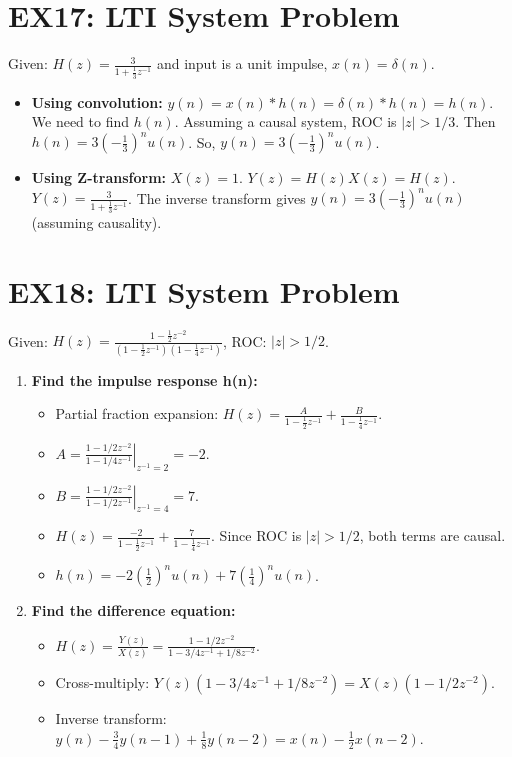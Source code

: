 \documentclass[a4paper,12pt]{article}
\begin{document}
\section*{EX17: LTI System Problem}
Given: $H(z) = \frac{3}{1+\frac{1}{3}z^{-1}}$ and input is a unit impulse, $x(n)=\delta(n)$.
\begin{itemize}
    \item \textbf{Using convolution:} $y(n) = x(n)*h(n) = \delta(n)*h(n)=h(n)$. We need to find $h(n)$. Assuming a causal system, ROC is $|z|>1/3$. Then $h(n) = 3(-\frac{1}{3})^n u(n)$. So, $y(n)=3(-\frac{1}{3})^n u(n)$.
    \item \textbf{Using Z-transform:} $X(z)=1$. $Y(z)=H(z)X(z)=H(z)$.
    $Y(z) = \frac{3}{1+\frac{1}{3}z^{-1}}$. The inverse transform gives $y(n)=3(-\frac{1}{3})^n u(n)$ (assuming causality).
\end{itemize}


\section*{EX18: LTI System Problem}
Given: $H(z) = \frac{1-\frac{1}{2}z^{-2}}{(1-\frac{1}{2}z^{-1})(1-\frac{1}{4}z^{-1})}$, ROC: $|z|>1/2$.
\begin{enumerate}
    \item \textbf{Find the impulse response h(n):}
        \begin{itemize}
            \item Partial fraction expansion: $H(z) = \frac{A}{1-\frac{1}{2}z^{-1}} + \frac{B}{1-\frac{1}{4}z^{-1}}$.
            \item $A = \left.\frac{1-1/2 z^{-2}}{1-1/4 z^{-1}}\right|_{z^{-1}=2} = -2$.
            \item $B = \left.\frac{1-1/2 z^{-2}}{1-1/2 z^{-1}}\right|_{z^{-1}=4} = 7$.
            \item $H(z) = \frac{-2}{1-\frac{1}{2}z^{-1}} + \frac{7}{1-\frac{1}{4}z^{-1}}$. Since ROC is $|z|>1/2$, both terms are causal.
            \item $h(n) = -2(\frac{1}{2})^n u(n) + 7(\frac{1}{4})^n u(n)$.
        \end{itemize}
    \item \textbf{Find the difference equation:}
        \begin{itemize}
            \item $H(z) = \frac{Y(z)}{X(z)} = \frac{1-1/2 z^{-2}}{1-3/4 z^{-1} + 1/8 z^{-2}}$.
            \item Cross-multiply: $Y(z)(1-3/4 z^{-1} + 1/8 z^{-2}) = X(z)(1-1/2 z^{-2})$.
            \item Inverse transform: $y(n) - \frac{3}{4}y(n-1) + \frac{1}{8}y(n-2) = x(n) - \frac{1}{2}x(n-2)$.
        \end{itemize}
\end{enumerate}
\end{document}
